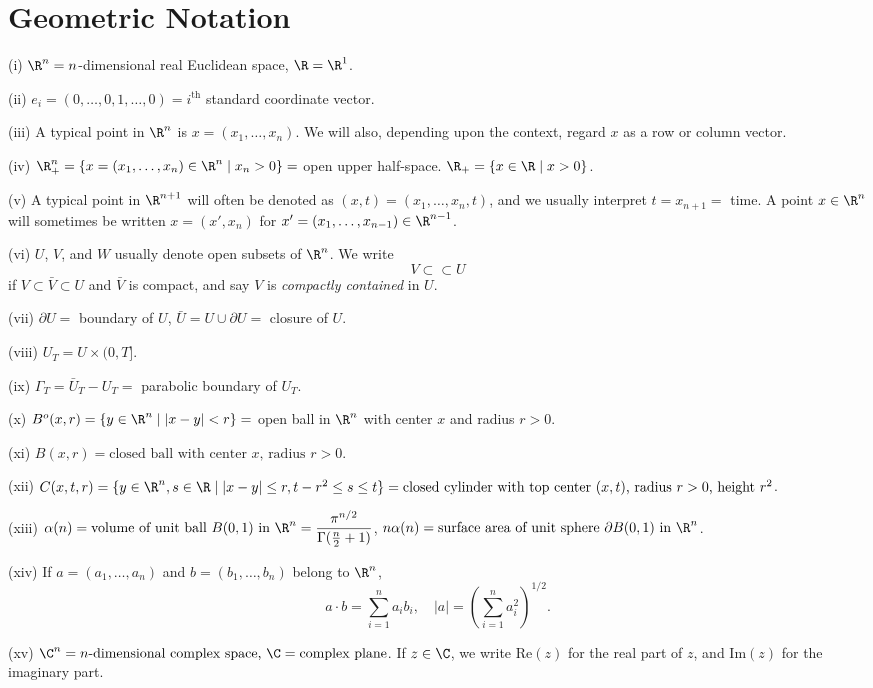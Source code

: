 \section{Geometric Notation}
\label{sec:geometric-notation}

\begin{definition}
\label{def:geometric-notation}
(i) $\R^n = n$-dimensional real Euclidean space, $\R = \R^1$.

(ii) $e_i = (0, \ldots, 0, 1, \ldots, 0) = i^{\text{th}}$ standard coordinate vector.

(iii) A typical point in $\R^n$ is $x = (x_1, \ldots, x_n)$. We will also, depending upon the context, regard $x$ as a row or column vector.

(iv) $\R_+^n = \{x = (x_1, \ldots, x_n) \in \R^n \mid x_n > 0\} = $ open upper half-space. $\R_+ = \{x \in \R \mid x > 0\}$.

(v) A typical point in $\R^{n+1}$ will often be denoted as $(x,t) = (x_1, \ldots, x_n, t)$, and we usually interpret $t = x_{n+1} = $ time. A point $x \in \R^n$ will sometimes be written $x = (x', x_n)$ for $x' = (x_1, \ldots, x_{n-1}) \in \R^{n-1}$.

(vi) $U$, $V$, and $W$ usually denote open subsets of $\R^n$. We write
$$V \subset\subset U$$
if $V \subset \bar{V} \subset U$ and $\bar{V}$ is compact, and say $V$ is \textit{compactly contained} in $U$.

(vii) $\partial U = $ boundary of $U$, $\bar{U} = U \cup \partial U = $ closure of $U$.

(viii) $U_T = U \times (0, T]$.

(ix) $\Gamma_T = \bar{U}_T - U_T = $ parabolic boundary of $U_T$.

(x) $B^o(x,r) = \{y \in \R^n \mid |x - y| < r\} = $ open ball in $\R^n$ with center $x$ and radius $r > 0$.

(xi) $B(x, r) = \text{closed ball with center } x\text{, radius } r > 0$.

(xii) $C(x, t, r) = \{y \in \R^n, s \in \R \mid |x - y| \le r, t - r^2 \le s \le t\} = \text{closed cylinder with top center } (x, t)\text{, radius } r > 0\text{, height } r^2$.

(xiii) $\alpha(n) = \text{volume of unit ball } B(0, 1) \text{ in } \R^n = \dfrac{\pi^{n/2}}{\Gamma(\frac{n}{2}+1)}$,
$n\alpha(n) = \text{surface area of unit sphere } \partial B(0, 1) \text{ in } \R^n$.

(xiv) If $a = (a_1, \ldots, a_n)$ and $b = (b_1, \ldots, b_n)$ belong to $\R^n$,
$$a \cdot b = \sum_{i=1}^n a_i b_i, \quad |a| = \left(\sum_{i=1}^n a_i^2\right)^{1/2}.$$

(xv) $\C^n = n\text{-dimensional complex space, } \C = \text{complex plane}$.
If $z \in \C$, we write $\text{Re}(z)$ for the real part of $z$, and $\text{Im}(z)$ for the imaginary part.
\end{definition}

